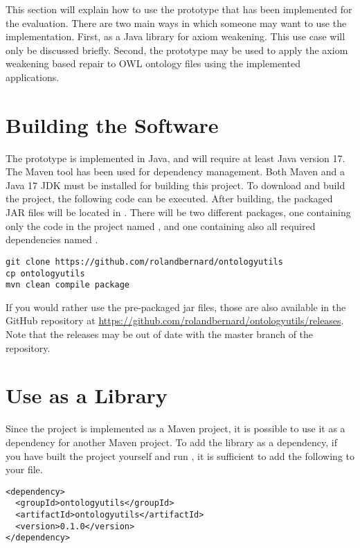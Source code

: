 
This section will explain how to use the prototype that has been implemented for the evaluation. There are two main ways in which someone may want to use the implementation. First, as a Java library for axiom weakening. This use case will only be discussed briefly. Second, the prototype may be used to apply the axiom weakening based repair to OWL ontology files using the implemented applications.

\section{Building the Software}

The prototype is implemented in Java, and will require at least Java version 17. The Maven tool has been used for dependency management. Both Maven and a Java 17 JDK must be installed for building this project. To download and build the project, the following code can be executed. After building, the packaged JAR files will be located in . There will be two different packages, one containing only the code in the project named , and one containing also all required dependencies named .

\begin{lstlisting}
git clone https://github.com/rolandbernard/ontologyutils
cp ontologyutils
mvn clean compile package
\end{lstlisting}

If you would rather use the pre-packaged jar files, those are also available in the GitHub repository at \url{https://github.com/rolandbernard/ontologyutils/releases}. Note that the releases may be out of date with the master branch of the repository.

\section{Use as a Library}

Since the project is implemented as a Maven project, it is possible to use it as a dependency for another Maven project. To add the library as a dependency, if you have built the project yourself and run , it is sufficient to add the following to your  file. 

\begin{lstlisting}
<dependency>
  <groupId>ontologyutils</groupId>
  <artifactId>ontologyutils</artifactId>
  <version>0.1.0</version>
</dependency>
\end{lstlisting}


